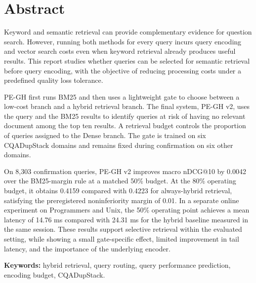 \chapter*{Abstract}
Keyword and semantic retrieval can provide complementary evidence for question search. However, running both methods for every query incurs query encoding and vector search costs even when keyword retrieval already produces useful results. This report studies whether queries can be selected for semantic retrieval before query encoding, with the objective of reducing processing costs under a predefined quality loss tolerance.

PE-GH first runs BM25 and then uses a lightweight gate to choose between a low-cost branch and a hybrid retrieval branch. The final system, PE-GH v2, uses the query and the BM25 results to identify queries at risk of having no relevant document among the top ten results. A retrieval budget controls the proportion of queries assigned to the Dense branch. The gate is trained on six CQADupStack domains and remains fixed during confirmation on six other domains.

On 8,303 confirmation queries, PE-GH v2 improves macro nDCG@10 by 0.0042 over the BM25-margin rule at a matched 50\% budget. At the 80\% operating budget, it obtains 0.4159 compared with 0.4223 for always-hybrid retrieval, satisfying the preregistered noninferiority margin of 0.01. In a separate online experiment on Programmers and Unix, the 50\% operating point achieves a mean latency of 14.76 ms compared with 24.31 ms for the hybrid baseline measured in the same session. These results support selective retrieval within the evaluated setting, while showing a small gate-specific effect, limited improvement in tail latency, and the importance of the underlying encoder.

\textbf{Keywords:} hybrid retrieval, query routing, query performance prediction, encoding budget, CQADupStack.
